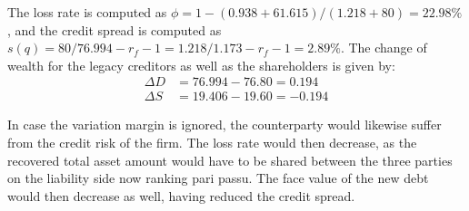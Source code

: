 \documentclass[../main.tex]{subfiles}
\begin{document}
        The loss rate is computed as
        $\phi = 1-(0.938+61.615)/(1.218+80) = 22.98\%$,
        and the credit spread is computed as
        $s(q) = 80/76.994 - r_f - 1 = 1.218/1.173 - r_f - 1 = 2.89\%$. The change of wealth for the legacy creditors as well as the shareholders is given by:
        \begin{align}
            \Delta D &= 76.994 - 76.80 = 0.194\\
            \Delta S &= 19.406 - 19.60 = -0.194
        \end{align}

        In case the variation margin is ignored, the counterparty would likewise suffer from the credit risk of the firm.
        The loss rate would then decrease,
        as the recovered total asset amount would have to be shared between the three parties on the liability side now ranking pari passu. The face value of the new debt would then decrease as well, having reduced the credit spread.
\end{document}
